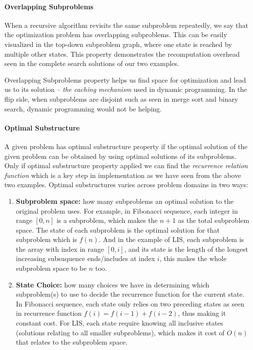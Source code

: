 \documentclass[../main.tex]{subfiles}
\begin{document}
\paragraph{Overlapping Subproblems}
When a recursive algorithm revisits the same subproblem repeatedly, we say that the optimization problem has overlapping subproblems. This can be easily visualized in the top-down subproblem graph, where one state is reached by multiple other states.  This property demonstrates the recomputation overhead seen in the complete search solutions of our two examples. 

Overlapping Subproblems property helps us find space for optimization and lead us to its solution -- \textit{the caching mechanism} used in dynamic programming. In the flip side, when subproblems are disjoint such as seen in merge sort and binary search, dynamic programming would not be helping.  
\paragraph{Optimal Substructure}
A given problem has optimal substructure property if the optimal solution of the given problem can be obtained by using optimal solutions of its subproblems. Only if optimal substructure property applied we can find the \textit{recurrence relation function} which is a key step in implementation as we have seen from the above two examples. Optimal substructures varies across problem domains in two ways:
\begin{enumerate}
    \item \textbf{Subproblem space:} how many subproblems an optimal solution to the original problem uses. For example, in Fibonacci sequence, each integer in range $[0, n]$ is a subproblem, which makes the $n+1$ as the total subproblem space. The state of each subproblem is the optimal solution for that subproblem which is $f(n)$. And in the example of LIS, each subproblem is the array with index in range $[0, i]$, and its state is the length of the longest increasing subsuquence ends/includes at index $i$, this makes the whole subproblem space to be $n$ too. 
    \item \textbf{State Choice:} how many choices we have in determining which subproblem(s) to use to decide the recurrence function for the current state. In Fibonacci sequence, each state only relies on two preceding states as seen in recurrence function $f(i)=f(i-1)+f(i-2)$, thus making it constant cost. For LIS, each state require knowing all inclusive states (solutions  relating to all smaller subproblems), which makes it cost of $O(n)$ that relates to the subproblem space. 
\end{enumerate}
\end{document}
